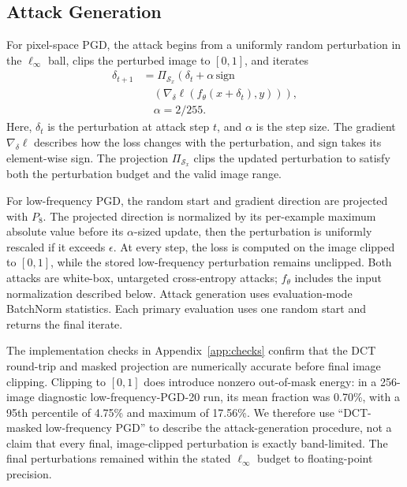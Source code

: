 \documentclass{article}
\newcommand{\linf}{\ell_\infty}
\begin{document}
\subsection{Attack Generation}
\label{sec:attacks}
For pixel-space PGD, the attack begins from a uniformly random perturbation in
the $\linf$ ball, clips the perturbed image to $[0,1]$, and iterates
\begin{equation}
  \begin{aligned}
    \delta_{t+1}
    &=\Pi_{\mathcal{S}_x}\left(\delta_t+\alpha\,
      \mathrm{sign}\right. \\
    &\quad\left.\left(\nabla_\delta
      \ell(f_\theta(x+\delta_t),y)\right)\right), \\
    &\quad \alpha=2/255.
  \end{aligned}
  \label{eq:pixel-pgd}
\end{equation}
Here, $\delta_t$ is the perturbation at attack step $t$, and $\alpha$ is the
step size. The gradient $\nabla_\delta\ell$ describes how the loss changes
with the perturbation, and $\mathrm{sign}$ takes its element-wise sign. The
projection $\Pi_{\mathcal{S}_x}$ clips the updated perturbation to satisfy
both the perturbation budget and the valid image range.

For low-frequency PGD, the random start and gradient direction are projected
with $P_8$. The projected direction is normalized by its per-example maximum
absolute value before its $\alpha$-sized update, then the perturbation is
uniformly rescaled if it exceeds $\epsilon$. At every step, the loss is
computed on the image clipped to $[0,1]$, while the stored low-frequency
perturbation remains unclipped. Both attacks are white-box, untargeted
cross-entropy attacks; $f_\theta$ includes the input normalization described
below. Attack generation uses evaluation-mode BatchNorm statistics.
Each primary evaluation uses one random start and returns the final iterate.

The implementation checks in Appendix~\ref{app:checks} confirm that the DCT
round-trip and masked projection are numerically accurate before final image
clipping. Clipping to $[0,1]$ does introduce nonzero out-of-mask energy: in a
256-image diagnostic low-frequency-PGD-20 run, its mean fraction was 0.70\%,
with a 95th percentile of 4.75\% and maximum of 17.56\%. We therefore use
``DCT-masked low-frequency PGD'' to describe the attack-generation procedure,
not a claim that every final, image-clipped perturbation is exactly
band-limited. The final perturbations remained within the stated $\linf$
budget to floating-point precision.
\end{document}
